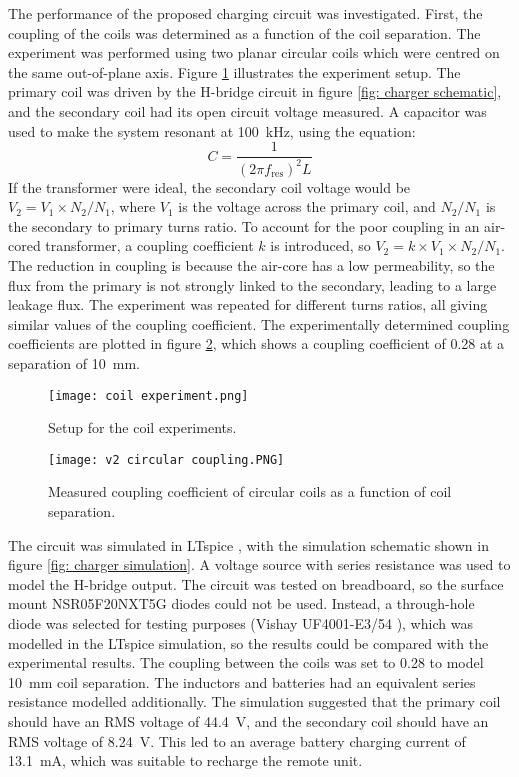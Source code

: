 The performance of the proposed charging circuit was investigated. First, the coupling of the coils was determined as a function of the coil separation. The experiment was performed using two planar circular coils which were centred on the same out-of-plane axis. Figure \ref{fig: coil experiment setup} illustrates the experiment setup. The primary coil was driven by the H-bridge circuit in figure \ref{fig: charger schematic}, and the secondary coil had its open circuit voltage measured. A capacitor was used to make the system resonant at \SI{100}{\kilo\hertz}, using the equation:
\begin{equation}
C = \frac{1}{(2\pi f_\text{res})^2L}
\end{equation}
If the transformer were ideal, the secondary coil voltage would be $V_2 = V_1 \times N_2 / N_1$, where $V_1$ is the voltage across the primary coil, and $N_2 / N_1$ is the secondary to primary turns ratio. To account for the poor coupling in an air-cored transformer, a coupling coefficient $k$ is introduced, so $V_2 = k \times V_1 \times N_2 / N_1$. The reduction in coupling is because the air-core has a low permeability, so the flux from the primary is not strongly linked to the secondary, leading to a large leakage flux. The experiment was repeated for different turns ratios, all giving similar values of the coupling coefficient. The experimentally determined coupling coefficients are plotted in figure \ref{fig: circular coupling}, which shows a coupling coefficient of 0.28 at a separation of \SI{10}{\milli\metre}.\\

\begin{figure}[ht]
	\centering
	\texttt{[image: coil experiment.png]}
	\caption{Setup for the coil experiments.}
	\label{fig: coil experiment setup}
\end{figure}
\begin{figure}[ht]
	\centering
	\texttt{[image: v2 circular coupling.PNG]}
	\caption{Measured coupling coefficient of circular coils as a function of coil separation.}
	\label{fig: circular coupling}
\end{figure}

The circuit was simulated in LTspice \cite{ltspice}, with the simulation schematic shown in figure \ref{fig: charger simulation}. A voltage source with series resistance was used to model the H-bridge output. The circuit was tested on breadboard, so the surface mount NSR05F20NXT5G diodes could not be used. Instead, a through-hole diode was selected for testing purposes (Vishay UF4001-E3/54 \cite{tht_diode}), which was modelled in the LTspice simulation, so the results could be compared with the experimental results. The coupling between the coils was set to 0.28 to model \SI{10}{\milli\metre} coil separation. The inductors and batteries had an equivalent series resistance modelled additionally. The simulation suggested that the primary coil should have an RMS voltage of \SI{44.4}{\volt}, and the secondary coil should have an RMS voltage of \SI{8.24}{\volt}. This led to an average battery charging current of \SI{13.1}{\milli\ampere}, which was suitable to recharge the remote unit. \\

